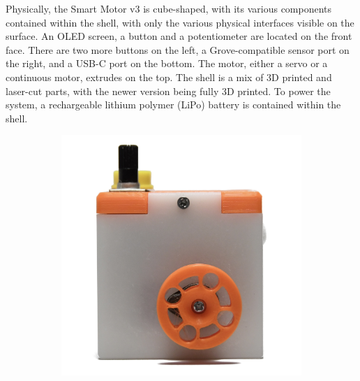 Physically, the Smart Motor v3 is cube-shaped, with its various components contained within the shell, with only the various physical interfaces visible on the surface. 
An OLED screen, a button and a potentiometer are located on the front face. There are two more buttons on the left, a Grove-compatible sensor port \citep{seeed_studio_grove_2023}  on the right, and a USB-C port on the bottom. The motor, either a servo or a continuous motor, extrudes on the top. The shell is a mix of 3D printed and laser-cut parts, with the newer version being fully 3D printed. To power the system, a rechargeable lithium polymer (LiPo) battery is contained within the shell.

\begin{figure}[H]
    \centering
    \begin{subfigure}[b]{0.25\textwidth}
        \includegraphics[width=\linewidth]{overleaf/images/sm_top.jpg}
    \end{subfigure}
    \begin{subfigure}[b]{0.25\textwidth}

\end{subfigure}
\end{figure}
